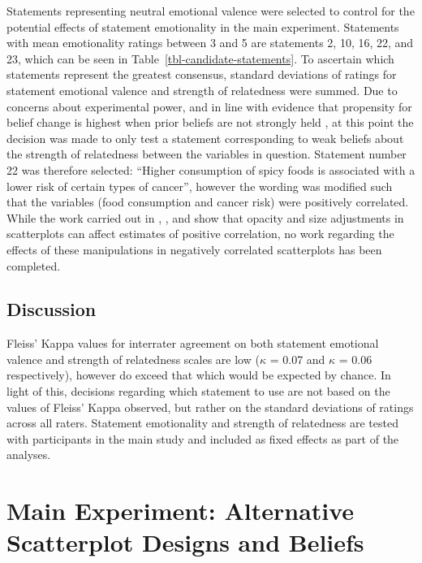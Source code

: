 \documentclass[../main.tex]{subfiles}
\begin{document}
Statements representing neutral emotional valence were selected to
control for the potential effects of statement emotionality in the main
experiment. Statements with mean emotionality ratings between 3 and 5
are statements 2, 10, 16, 22, and 23, which can be seen in
Table~\ref{tbl-candidate-statements}. To ascertain which statements
represent the greatest consensus, standard deviations of ratings for
statement emotional valence and strength of relatedness were summed. Due
to concerns about experimental power, and in line with evidence that
propensity for belief change is highest when prior beliefs are not
strongly held \cite{xiong_2023, markant_2023}, at this point the
decision was made to only test a statement corresponding to weak beliefs
about the strength of relatedness between the variables in question.
Statement number 22 was therefore selected: ``Higher consumption of
spicy foods is associated with a lower risk of certain types of
cancer'', however the wording was modified such that the variables (food
consumption and cancer risk) were positively correlated. While the work
carried out in ,
, and 
show that opacity and size adjustments in scatterplots can affect
estimates of positive correlation, no work regarding the effects of
these manipulations in negatively correlated scatterplots has been
completed.

\subsection{Discussion}\label{discussion-e5a}

Fleiss' Kappa values for interrater agreement on both statement
emotional valence and strength of relatedness scales are low (\(\kappa\)
= 0.07 and \(\kappa\) = 0.06 respectively), however do exceed that which
would be expected by chance. In light of this, decisions regarding which
statement to use are not based on the values of Fleiss' Kappa observed,
but rather on the standard deviations of ratings across all raters.
Statement emotionality and strength of relatedness are tested with
participants in the main study and included as fixed effects as part of
the analyses.

\section{Main Experiment: Alternative Scatterplot Designs and
Beliefs}\label{beliefs-main-e5}
\end{document}
